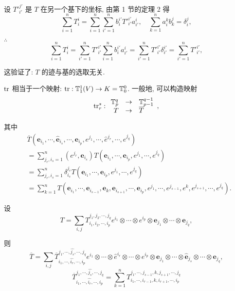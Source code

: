 \documentclass[color=black,device=normal,lang=cn,mode=geye]{elegantnote}
\begin{document}
设 ${T'}_{i'}^{j'}$ 是 $T$ 在另一个基下的坐标, 由第 1 节的定理 2 得
\[\sum\limits_{i=1}^nT_i^i=\sum\limits_{i=1}^n\sum\limits_{i'=1}^nb_i^{i'}{T'}_{i'}^{i'}a_{i'}^i,\quad\sum\limits_{k=1}^na_i^kb_k^j=\delta_i^j,\]

$\therefore$
\[\sum\limits_{i=1}^nT_i^i=\sum\limits_{i'=1}^n{T'}_{i'}^{i'}\sum\limits_{i=1}^nb_i^{i'}a_{i'}^i=\sum\limits_{i'=1}^n{T'}_{i'}^{i'}\delta_{i'}^{i'}=\sum\limits_{i'=1}^n{T'}_{i'}^{i'},\]

这验证了: $T$ 的迹与基的选取无关.

$\operatorname{tr} $ 相当于一个映射: $\operatorname{tr} :\mathbb{T}_1^1(V)\to K=\mathbb{T}_0^0$. 一般地, 可以构造映射
\[\operatorname{tr} _r^s:\begin{array}{rcl}
    \mathbb{T}_p^q & \to & \mathbb{T}_{p-1}^{q-1} \\
    T & \to & \overline{T} \\
\end{array},\]

其中
\begin{align*}
    & \overline{T}(\boldsymbol{e}_{i_1},\cdots,\hat{\boldsymbol{e}}_{i_s},\cdots,\boldsymbol{e}_{i_p},e^{j_1},\cdots,\hat{e}^{j_r},\cdots,e^{j_q}) \\
    & =\sum\limits_{j_r,i_s=1}^n(e^{j_r},\boldsymbol{e}_{i_s})T(\boldsymbol{e}_{i_1},\cdots,\boldsymbol{e}_{i_p},e^{j_1},\cdots,e^{j_q}) \\
    & =\sum\limits_{j_r,i_s=1}^n\delta_{i_s}^{j_r}T(\boldsymbol{e}_{i_1},\cdots,\boldsymbol{e}_{i_p},e^{j_1},\cdots,e^{j_q}) \\
    & =\sum\limits_{k=1}^nT(\boldsymbol{e}_{i_1},\cdots,\boldsymbol{e}_{i_{s-1}},\boldsymbol{e}_k,\boldsymbol{e}_{i_{s+1}},\cdots,\boldsymbol{e}_{i_p},e^{j_1},\cdots,e^{j_{s-1}},e^{k},e^{j_{s+1}},\cdots,e^{j_q}).
\end{align*}

设
\[T=\sum\limits_{i,j}T^{j_1,j_2,\cdots,j_q}_{i_1,i_2,\cdots,i_p}e^{i_1}\otimes\cdots\otimes e^{i_p}\otimes\boldsymbol{e}_{j_1}\otimes\cdots\otimes\boldsymbol{e}_{j_q},\]

则
\[\overline{T}=\sum\limits_{i,j}\overline{T}^{j_1,\cdots,\widehat{j_s},\cdots,j_q}_{i_1,\cdots,\widehat{i_r},\cdots,i_p}e^{i_1}\otimes\cdots\otimes\hat{e}^{i_r}\otimes\cdots\otimes e^{i_p}\otimes\boldsymbol{e}_{j_1}\otimes\cdots\otimes\hat{\boldsymbol{e}}_{j_s}\otimes\cdots\otimes\boldsymbol{e}_{j_q},\]
\[\overline{T}^{j_1,\cdots,\widehat{j_s},\cdots,j_q}_{i_1,\cdots,\widehat{i_r},\cdots,i_p}=\sum\limits_{k=1}^nT^{j_1,\cdots,j_{s-1},k,j_{s+1},\cdots,j_q}_{i_1,\cdots,i_{r-1},k,i_{r+1},\cdots,i_p}\]
\end{document}

